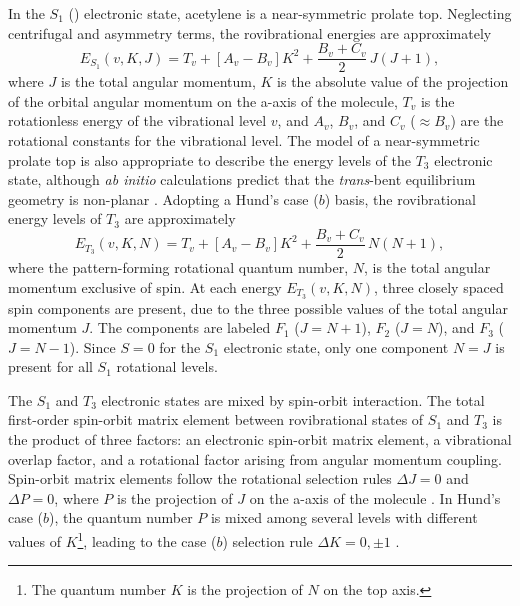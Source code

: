 \documentclass[12pt]{mitthesis}
\begin{document}
In the $S_1$ (\astate) electronic state, acetylene is a near-symmetric
prolate top.  Neglecting centrifugal and asymmetry terms, the
rovibrational energies are approximately \cite{watson82}
\begin{equation}
  \label{eq:s1-energy-levels}
  E_{S_1}(v,K,J) = T_v + [A_v - B_v] K^2 + \frac{B_v+C_v}{2} \, J(J+1),
\end{equation}
where $J$ is the total angular momentum, $K$ is the absolute value of
the projection of the orbital angular momentum on the a-axis of the
molecule, $T_v$ is the rotationless energy of the vibrational level
$v$, and $A_v$, $B_v$, and $C_v$ ($\approx B_v$) are the rotational
constants for the vibrational level.  The model of a near-symmetric
prolate top is also appropriate to describe the energy levels of the
$T_3$ electronic state, although \emph{ab initio} calculations predict
that the \emph{trans}-bent equilibrium geometry is non-planar
\cite{ventura03, thom07}.  Adopting a Hund's case ($b$) basis, the
rovibrational energy levels of $T_3$ are approximately
\begin{equation}
  \label{eq:t3-energy-levels}
  E_{T_3}(v,K,N) = T_v + [A_v - B_v] K^2 + \frac{B_v+C_v}{2} \, N(N+1),
\end{equation}
where the pattern-forming rotational quantum number, $N$, is the total
angular momentum exclusive of spin.  At each energy $E_{T_3}(v,K,N)$,
three closely spaced spin components are present, due to the three
possible values of the total angular momentum $J$.  The components are
labeled $F_1$ ($J=N+1$), $F_2$ ($J=N$), and $F_3$ ($J=N-1$).  
Since $S=0$ for the $S_1$ electronic state,
only one component $N=J$ is present for all $S_1$ rotational levels.



The $S_1$ and $T_3$ electronic states are mixed by spin-orbit
interaction.  The total first-order spin-orbit matrix element between
rovibrational states of $S_1$ and $T_3$ is the product of three
factors: an electronic spin-orbit matrix element, a vibrational
overlap factor, and a rotational factor arising from angular momentum
coupling.  Spin-orbit matrix elements follow the rotational selection
rules $\Delta J = 0$ and $\Delta P = 0$, where $P$ is the projection
of $J$ on the a-axis of the molecule \cite{hougen64}.  In Hund's case
($b$), the quantum number $P$ is mixed among several levels with
different values of $K$\footnote{The quantum number $K$ is the
  projection of $N$ on the top axis.}, leading to the case ($b$)
selection rule $\Delta K = 0, \pm 1$ \cite{hougen64, stevens73}.
\end{document}
